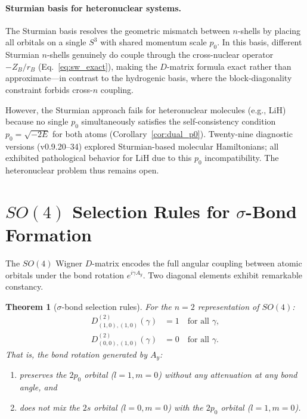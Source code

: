 \documentclass[aps,pra,twocolumn,superscriptaddress,longbibliography]{revtex4-2}
\newtheorem{theorem}{Theorem}
\begin{document}
\paragraph{Sturmian basis for heteronuclear systems.}
The Sturmian basis resolves the geometric mismatch between $n$-shells by
placing all orbitals on a single $S^3$ with shared momentum scale $p_0$.
In this basis, different Sturmian $n$-shells genuinely do couple through
the cross-nuclear operator $-Z_B/r_B$ (Eq.~\eqref{eq:sw_exact}), making
the $D$-matrix formula exact rather than approximate---in contrast to the
hydrogenic basis, where the block-diagonality constraint forbids cross-$n$
coupling.

However, the Sturmian approach fails for heteronuclear molecules (e.g.,
LiH) because no single $p_0$ simultaneously satisfies the
self-consistency condition $p_0 = \sqrt{-2E}$ for both atoms
(Corollary~\ref{cor:dual_p0}).  Twenty-nine diagnostic versions
(v0.9.20--34) explored Sturmian-based molecular Hamiltonians; all
exhibited pathological behavior for LiH due to this $p_0$
incompatibility.  The heteronuclear problem thus remains open.


\section{$SO(4)$ Selection Rules for $\sigma$-Bond Formation}
\label{sec:selection_rules}

The $SO(4)$ Wigner $D$-matrix encodes the full angular coupling between
atomic orbitals under the bond rotation $e^{i\gamma A_y}$.  Two diagonal
elements exhibit remarkable constancy.

\begin{theorem}[$\sigma$-bond selection rules]
\label{thm:selection}
For the $n = 2$ representation of $SO(4)$:
\begin{align}
D^{(2)}_{(1,0),(1,0)}(\gamma) &= 1 \quad \text{for all } \gamma,
\label{eq:D2_1010} \\
D^{(2)}_{(0,0),(1,0)}(\gamma) &= 0 \quad \text{for all } \gamma.
\label{eq:D2_0010}
\end{align}
That is, the bond rotation generated by $A_y$:
\begin{enumerate}
\item preserves the $2p_0$ orbital ($l = 1, m = 0$) without any
attenuation at any bond angle, and
\item does not mix the $2s$ orbital ($l = 0, m = 0$) with the $2p_0$
orbital ($l = 1, m = 0$).
\end{enumerate}
\end{theorem}
\end{document}

